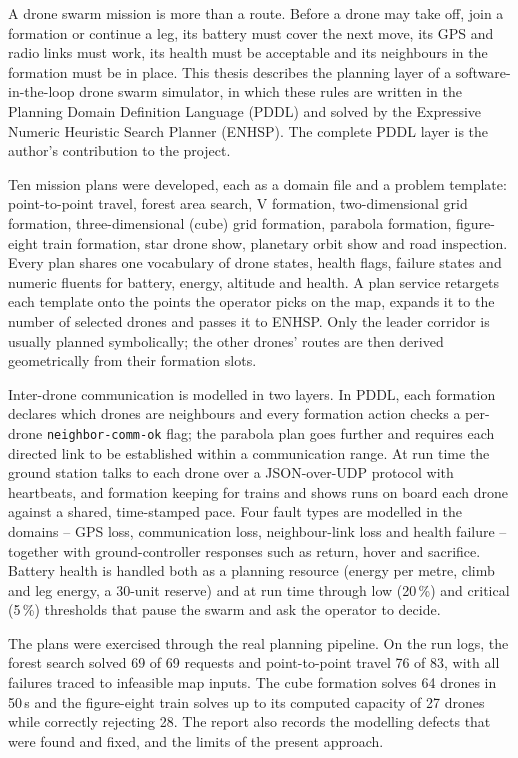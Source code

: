 \documentclass[11pt,a4paper,oneside]{report}
\newcommand{\code}[1]{\texttt{#1}}
\begin{document}
\medskip
A drone swarm mission is more than a route. Before a drone may take off, join a formation or
continue a leg, its battery must cover the next move, its GPS and radio links must work, its
health must be acceptable and its neighbours in the formation must be in place. This thesis
describes the planning layer of a software-in-the-loop drone swarm simulator, in which these
rules are written in the Planning Domain Definition Language (PDDL) and solved by the
Expressive Numeric Heuristic Search Planner (ENHSP). The complete PDDL layer is the author's
contribution to the project.

Ten mission plans were developed, each as a domain file and a problem template: point-to-point
travel, forest area search, V formation, two-dimensional grid formation, three-dimensional
(cube) grid formation, parabola formation, figure-eight train formation, star drone show,
planetary orbit show and road inspection. Every plan shares one vocabulary of drone states,
health flags, failure states and numeric fluents for battery, energy, altitude and health. A
plan service retargets each template onto the points the operator picks on the map, expands it
to the number of selected drones and passes it to ENHSP. Only the leader corridor is usually
planned symbolically; the other drones' routes are then derived geometrically from their
formation slots.

Inter-drone communication is modelled in two layers. In PDDL, each formation declares which
drones are neighbours and every formation action checks a per-drone \code{neighbor-comm-ok}
flag; the parabola plan goes further and requires each directed link to be established within
a communication range. At run time the ground station talks to each drone over a JSON-over-UDP
protocol with heartbeats, and formation keeping for trains and shows runs on board each drone
against a shared, time-stamped pace. Four fault types are modelled in the domains -- GPS loss,
communication loss, neighbour-link loss and health failure -- together with ground-controller
responses such as return, hover and sacrifice. Battery health is handled both as a planning
resource (energy per metre, climb and leg energy, a 30-unit reserve) and at run time through
low (20\,\%) and critical (5\,\%) thresholds that pause the swarm and ask the operator to decide.

The plans were exercised through the real planning pipeline. On the run logs, the forest search
solved 69 of 69 requests and point-to-point travel 76 of 83, with all failures traced to
infeasible map inputs. The cube formation solves 64 drones in 50\,s and the figure-eight train
solves up to its computed capacity of 27 drones while correctly rejecting 28. The report also
records the modelling defects that were found and fixed, and the limits of the present
approach.
\end{document}
